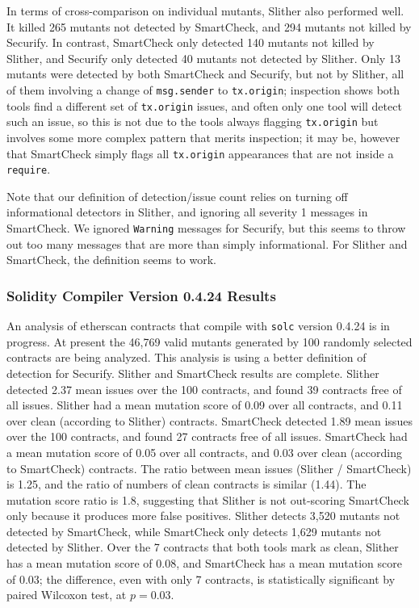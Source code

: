 \documentclass{article}
\begin{document}
In terms of cross-comparison on individual mutants, Slither also performed well.  It killed 265 mutants not detected by SmartCheck, and 294 mutants not killed by Securify.  In contrast, SmartCheck only detected 140 mutants not killed by Slither, and Securify only detected 40 mutants not detected by Slither.  Only 13 mutants were detected by both SmartCheck and Securify, but not by Slither, all of them involving a change of {\tt msg.sender} to {\tt tx.origin}; inspection shows both tools find a different set of {\tt tx.origin} issues, and often only one tool will detect such an issue, so this is not due to the tools always flagging {\tt tx.origin} but involves some more complex pattern that merits inspection; it may be, however that SmartCheck simply flags all {\tt tx.origin} appearances that are not inside a {\tt require}.

Note that our definition of detection/issue count relies on turning off informational detectors in Slither, and ignoring all severity 1 messages in SmartCheck.  We ignored {\tt Warning} messages for Securify, but this seems to throw out too many messages that are more than simply informational.  For Slither and SmartCheck, the definition seems to work.

\subsubsection{Solidity Compiler Version 0.4.24 Results}

An analysis of etherscan contracts that compile with {\tt solc} version 0.4.24 is in progress.  At present the 46,769 valid mutants generated by 100 randomly selected contracts are being analyzed.  This analysis is using a better definition of detection for Securify.  Slither and SmartCheck results are complete.  Slither detected 2.37 mean issues over the 100 contracts, and found 39 contracts free of all issues.  Slither had a mean mutation score of 0.09 over all contracts, and 0.11 over clean (according to Slither) contracts.
SmartCheck detected 1.89 mean issues over the 100 contracts, and found 27 contracts free of all issues.  SmartCheck had a mean mutation score of 0.05 over all contracts, and 0.03 over clean (according to SmartCheck) contracts.  The ratio between mean issues (Slither / SmartCheck) is 1.25, and the ratio of numbers of clean contracts is similar (1.44).  The mutation score ratio is 1.8, suggesting that Slither is not out-scoring SmartCheck only because it produces more false positives.  Slither detects 3,520 mutants not detected by SmartCheck, while SmartCheck only detects 1,629 mutants not detected by Slither.  Over the 7 contracts that both tools mark as clean, Slither has a mean mutation score of 0.08, and SmartCheck has a mean mutation score of 0.03; the difference, even with only 7 contracts, is statistically significant by paired Wilcoxon test, at $p=0.03$.
\end{document}
